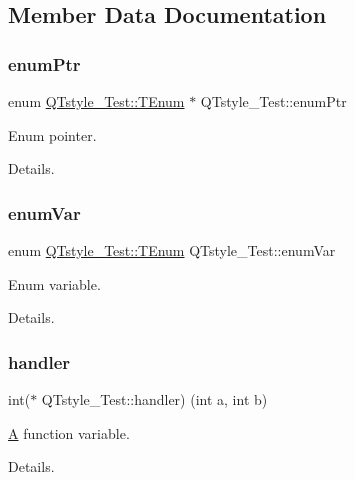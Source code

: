 \subsection{Member Data Documentation}
\mbox{\label{class_q_tstyle___test_a973a4566c9a036f4eca508ba5fe80dcb}} 
\subsubsection{\texorpdfstring{enumPtr}{enumPtr}}
{\footnotesize\ttfamily enum \mbox{\hyperlink{class_q_tstyle___test_a0525f798cda415a94fedeceb806d2c49}{Q\+Tstyle\+\_\+\+Test\+::\+T\+Enum}}
         $\ast$ Q\+Tstyle\+\_\+\+Test\+::enum\+Ptr}



Enum pointer. 

Details. \mbox{\label{class_q_tstyle___test_adb265d815b43f1f7f0de0e8b8852a5d0}} 
\subsubsection{\texorpdfstring{enumVar}{enumVar}}
{\footnotesize\ttfamily enum \mbox{\hyperlink{class_q_tstyle___test_a0525f798cda415a94fedeceb806d2c49}{Q\+Tstyle\+\_\+\+Test\+::\+T\+Enum}}
          Q\+Tstyle\+\_\+\+Test\+::enum\+Var}



Enum variable. 

Details. \mbox{\label{class_q_tstyle___test_a79dd4e5498f09057775a819d911349e2}} 
\subsubsection{\texorpdfstring{handler}{handler}}
{\footnotesize\ttfamily int($\ast$ Q\+Tstyle\+\_\+\+Test\+::handler) (int a, int b)}



\mbox{\hyperlink{class_a}{A}} function variable. 

Details. \mbox{\label{class_q_tstyle___test_aabf7b2e9ed83ea44aca4d213baae06d3}} 
